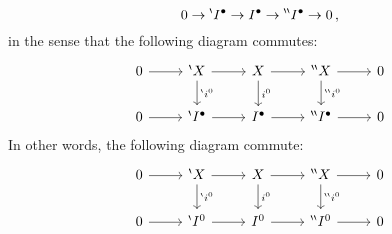 \begin{lemma}
\begin{enumerate}
\[        0
        \to
        {}^{\backprime}I^\bullet
        \to
        I^\bullet
        \to
        {}^{\backprime \backprime}I^\bullet
        \to
        0 \,,
      \]
      in the sense that the following diagram commutes:
      \[
        \begin{tikzcd}
            0
            \arrow{r}
          & \bp X
            \arrow{r}
            \arrow{d}[right]{\bp i^0}
          & X
            \arrow{r}
            \arrow{d}[right]{i^0}
          & \bpp X
            \arrow{r}
            \arrow{d}[right]{\bpp i^0}
          & 0
          \\
            0
            \arrow{r}
          & \bp\Iccc
            \arrow{r}
          & \Iccc
            \arrow{r}
          & \bpp\Iccc
            \arrow{r}
          & 0
        \end{tikzcd}
      \]
      In other words, the following diagram commute:
      \[
        \begin{tikzcd}
            0
            \arrow{r}
          & \bp X
            \arrow{r}
            \arrow{d}[right]{\bp i^0}
          & X
            \arrow{r}
            \arrow{d}[right]{i^0}
          & \bpp X
            \arrow{r}
            \arrow{d}[right]{\bpp i^0}
          & 0
          \\
            0
            \arrow{r}
          & \bp I^0
            \arrow{r}
          & I^0
            \arrow{r}
          & \bpp I^0
            \arrow{r}
          & 0
        \end{tikzcd}
      \]
  \end{enumerate}
\end{lemma}


